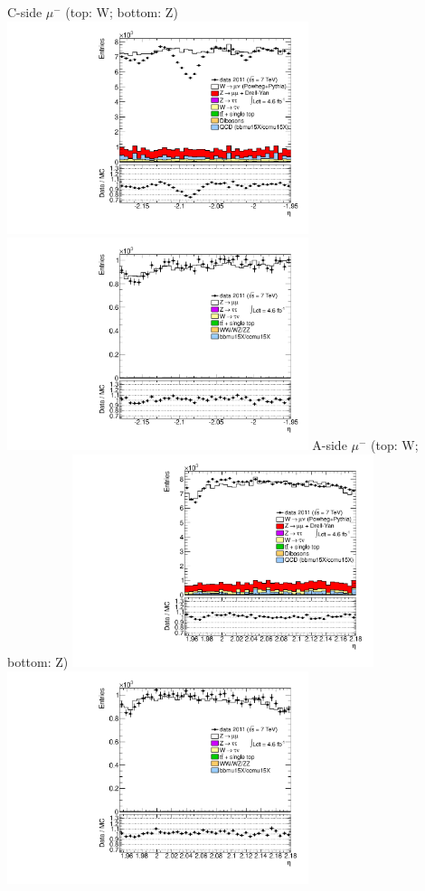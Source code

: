  {
\colb[T]
C-side $\mu^{-}$ (top: W; bottom: Z)
\centering
\includegraphics[width=0.66\textwidth]{dates/20130306/figures/etaphi/W_10_C_stack_l_eta_NEG} \\
\includegraphics[width=0.66\textwidth]{dates/20130306/figures/etaphi/Z_10_C_stack_lN_eta_ALL.pdf}
A-side $\mu^{-}$ (top: W; bottom: Z)
\centering
\includegraphics[width=0.66\textwidth]{dates/20130306/figures/etaphi/W_10_A_stack_l_eta_NEG} \\
\includegraphics[width=0.66\textwidth]{dates/20130306/figures/etaphi/Z_10_A_stack_lN_eta_ALL.pdf} 
\cole
}
